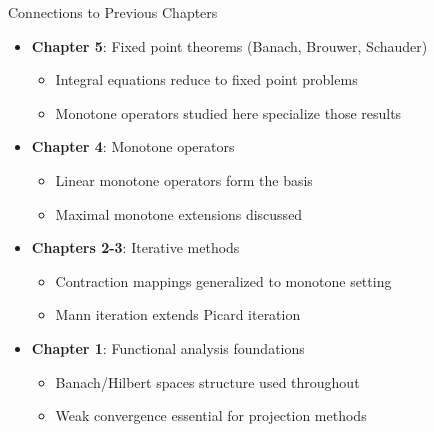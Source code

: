 \documentclass[aspectratio=169,10pt]{beamer}
\begin{document}
\begin{frame}{Connections to Previous Chapters}
    \begin{itemize}
        \item \textbf{Chapter 5}: Fixed point theorems (Banach, Brouwer, Schauder)
            \begin{itemize}
                \item Integral equations reduce to fixed point problems
                \item Monotone operators studied here specialize those results
            \end{itemize}

        \vspace{0.3cm}
        \item \textbf{Chapter 4}: Monotone operators
            \begin{itemize}
                \item Linear monotone operators form the basis
                \item Maximal monotone extensions discussed
            \end{itemize}

        \vspace{0.3cm}
        \item \textbf{Chapters 2-3}: Iterative methods
            \begin{itemize}
                \item Contraction mappings generalized to monotone setting
                \item Mann iteration extends Picard iteration
            \end{itemize}

        \vspace{0.3cm}
        \item \textbf{Chapter 1}: Functional analysis foundations
            \begin{itemize}
                \item Banach/Hilbert spaces structure used throughout
                \item Weak convergence essential for projection methods
            \end{itemize}
    \end{itemize}
\end{frame}
\end{document}
